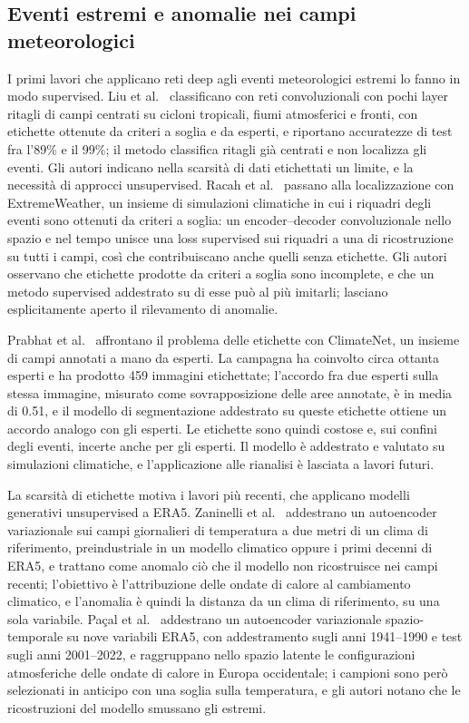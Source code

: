 \subsection{Eventi estremi e anomalie nei campi meteorologici}

I primi lavori che applicano reti deep agli eventi meteorologici estremi lo fanno in modo supervised. Liu et al.~\cite{liu2016extremeweather} classificano con reti convoluzionali con pochi layer ritagli di campi centrati su cicloni tropicali, fiumi atmosferici e fronti, con etichette ottenute da criteri a soglia e da esperti, e riportano accuratezze di test fra l'89\% e il 99\%; il metodo classifica ritagli già centrati e non localizza gli eventi. Gli autori indicano nella scarsità di dati etichettati un limite, e la necessità di approcci unsupervised. Racah et al.~\cite{racah2017extremeweather} passano alla localizzazione con ExtremeWeather, un insieme di simulazioni climatiche in cui i riquadri degli eventi sono ottenuti da criteri a soglia: un encoder--decoder convoluzionale nello spazio e nel tempo unisce una loss supervised sui riquadri a una di ricostruzione su tutti i campi, così che contribuiscano anche quelli senza etichette. Gli autori osservano che etichette prodotte da criteri a soglia sono incomplete, e che un metodo supervised addestrato su di esse può al più imitarli; lasciano esplicitamente aperto il rilevamento di anomalie.

Prabhat et al.~\cite{prabhat2021climatenet} affrontano il problema delle etichette con ClimateNet, un insieme di campi annotati a mano da esperti. La campagna ha coinvolto circa ottanta esperti e ha prodotto 459 immagini etichettate; l'accordo fra due esperti sulla stessa immagine, misurato come sovrapposizione delle aree annotate, è in media di 0.51, e il modello di segmentazione addestrato su queste etichette ottiene un accordo analogo con gli esperti. Le etichette sono quindi costose e, sui confini degli eventi, incerte anche per gli esperti. Il modello è addestrato e valutato su simulazioni climatiche, e l'applicazione alle rianalisi è lasciata a lavori futuri.

La scarsità di etichette motiva i lavori più recenti, che applicano modelli generativi unsupervised a ERA5. Zaninelli et al.~\cite{zaninelli2026aiattribution} addestrano un autoencoder variazionale sui campi giornalieri di temperatura a due metri di un clima di riferimento, preindustriale in un modello climatico oppure i primi decenni di ERA5, e trattano come anomalo ciò che il modello non ricostruisce nei campi recenti; l'obiettivo è l'attribuzione delle ondate di calore al cambiamento climatico, e l'anomalia è quindi la distanza da un clima di riferimento, su una sola variabile. Paçal et al.~\cite{pacal2026heatwavedrivers} addestrano un autoencoder variazionale spazio-temporale su nove variabili ERA5, con addestramento sugli anni 1941--1990 e test sugli anni 2001--2022, e raggruppano nello spazio latente le configurazioni atmosferiche delle ondate di calore in Europa occidentale; i campioni sono però selezionati in anticipo con una soglia sulla temperatura, e gli autori notano che le ricostruzioni del modello smussano gli estremi.

